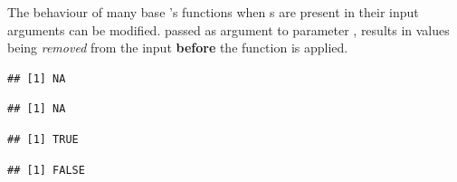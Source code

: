 \documentclass[krantz2]{krantz}\usepackage{knitr}%
\begin{document}
The behaviour of many base \Rlang's functions when s are present in their input arguments can be modified.  passed as argument to parameter , results in  values being \emph{removed} from the input \textbf{before} the function is applied.

\begin{knitrout}\footnotesize
{}\color{fgcolor}\begin{kframe}
\begin{alltt}
 \hlopt{<} \hlstd{)}
\end{alltt}
\begin{verbatim}
## [1] NA
\end{verbatim}
\begin{alltt}
 \hlopt{>} \hlstd{)}
\end{alltt}
\begin{verbatim}
## [1] NA
\end{verbatim}
\begin{alltt}
 \hlopt{<} \hlstd{,} \hlstd{=}\hlstd{)}
\end{alltt}
\begin{verbatim}
## [1] TRUE
\end{verbatim}
\begin{alltt}
 \hlopt{>} \hlstd{,} \hlstd{=}\hlstd{)}
\end{alltt}
\begin{verbatim}
## [1] FALSE
\end{verbatim}
\end{kframe}
\end{knitrout}
\end{document}
